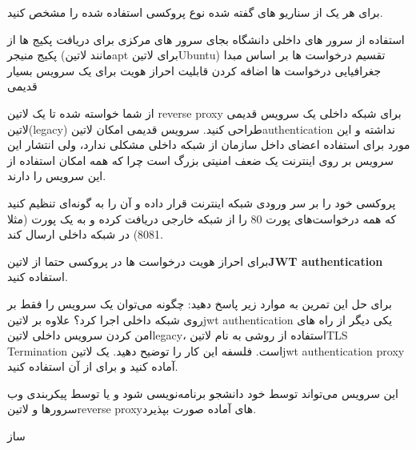 \documentclass{../assignment}
\begin{document}

برای هر یک از سناریو های گفته شده نوع پروکسی استفاده شده را مشخص کنید.

 استفاده از سرور های داخلی دانشگاه بجای سرور های مرکزی برای دریافت پکیج ها از پکیج منیجر (مانند ‌لاتین{apt} برای ‌لاتین{Ubuntu})
 تقسیم درخواست ها بر اساس مبدا جغرافیایی درخواست ها
 اضافه کردن قابلیت احراز هویت برای یک سرویس بسیار قدیمی



از شما خواسته شده تا یک ‌لاتین {reverse proxy} برای شبکه داخلی یک سرویس قدیمی ‌لاتین{(legacy)} طراحی کنید.
سرویس قدیمی امکان ‌لاتین{authentication} نداشته و این مورد برای استفاده اعضای داخل سازمان از شبکه داخلی مشکلی ندارد، ولی انتشار این سرویس بر روی اینترنت یک ضعف امنیتی بزرگ است چرا که همه امکان استفاده از این سرویس را دارند.

پروکسی خود را بر سر ورودی شبکه اینترنت قرار داده و آن را به گونه‌ای تنظیم کنید که همه درخواست‌های پورت 80 را از شبکه خارجی دریافت کرده و به یک پورت (مثلا 8081) در شبکه داخلی ارسال کند.


برای احراز هویت درخواست ها در پروکسی حتما از ‌لاتین{\textbf{JWT authentication}} استفاده کنید.

برای حل این تمرین به موارد زیر پاسخ دهید:
 چگونه می‌توان یک سرویس را فقط بر روی شبکه داخلی اجرا کرد؟
 علاوه بر ‌لاتین{jwt authentication} یکی دیگر از راه های امن کردن سرویس داخلی ‌لاتین{legacy}، استفاده از روشی به نام ‌لاتین{TLS Termination} است. فلسفه این کار را توضیح دهید.
 یک ‌لاتین{jwt authentication proxy} آماده کنید و برای  از آن استفاده کنید.

این سرویس می‌تواند توسط خود دانشجو برنامه‌نویسی شود و یا توسط پیکربندی وب سرورها و ‌لاتین{reverse proxy}های آماده صورت بپذیرد.

‌ساز
\end{document}
